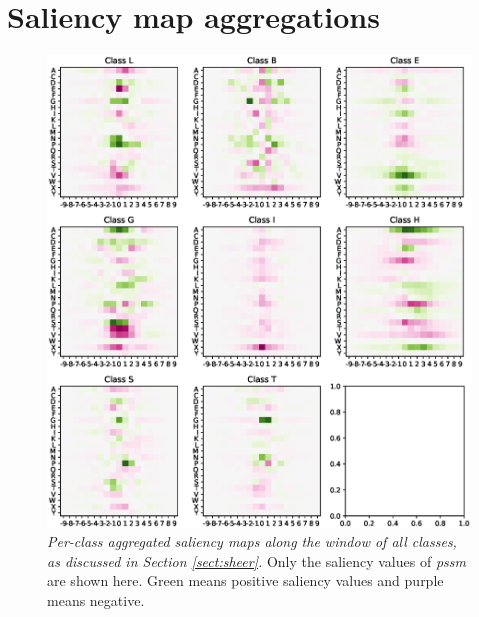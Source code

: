 \chapter{Saliency map aggregations} \label{Chapter:App}
\begin{figure}
\centering
\includegraphics[width=0.85\linewidth]{Figures/class_agg_class_all}
\caption{\textit{Per-class aggregated saliency maps along the window of all classes, as discussed in Section \ref{sect:sheer}.} Only the saliency values of \textit{pssm} are shown here. Green means positive saliency values and purple means negative.}
\label{fig:class_agg_class_all}
\end{figure}

